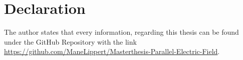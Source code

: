 \NewPage
\chapter*{Declaration}
\label{chap:declaration}

The author states that every information, regarding this thesis can be found under the GitHub Repository with the link \url{https://github.com/ManeLippert/Masterthesis-Parallel-Electric-Field}.